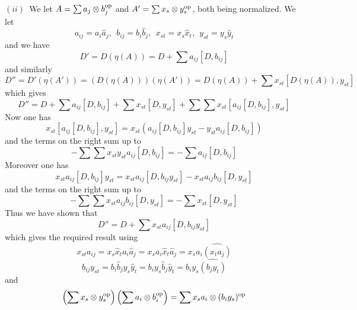 \documentclass[preprint]{revtex4}
\begin{document}
$(ii)$~We let $A=\sum a_j\otimes b_j^{\rm op}$ and $A'=\sum x_s\otimes y_s^{\rm op}$,   both being normalized. We let
\begin{equation*}
    a_{ij}=a_i\hat a_j,\ \ b_{ij}=b_i\hat b_j,\ \
    x_{st}=x_s\hat x_t,\ \ y_{st}=y_s\hat y_t
\end{equation*}
and we have
\begin{equation*}
    D'=D(\eta(A))=D+\sum a_{ij}[D,b_{ij}]
\end{equation*}
and similarly
\begin{equation*}
   D''=D'(\eta(A'))=\left(D(\eta(A))\right)(\eta(A'))=D(\eta(A))+
   \sum x_{st}[D(\eta(A)),y_{st}]
\end{equation*}
which gives
\begin{equation*}
    D''=D+\sum a_{ij}[D,b_{ij}]+\sum x_{st}[D,y_{st}]+
    \sum\sum x_{st}[a_{ij}[D,b_{ij}],y_{st}]
\end{equation*}
Now one has
\begin{equation*}
   x_{st}[a_{ij}[D,b_{ij}],y_{st}]=x_{st}\left(a_{ij}[D,b_{ij}]y_{st}-
   y_{st}a_{ij}[D,b_{ij}]
   \right)
\end{equation*}
and the terms on the right sum up to
\begin{equation*}
  -\sum\sum    x_{st}y_{st}a_{ij}[D,b_{ij}]=-\sum a_{ij}[D,b_{ij}]
\end{equation*}
Moreover one has
\begin{equation*}
    x_{st}a_{ij}[D,b_{ij}]y_{st}=x_{st}a_{ij}[D,b_{ij}y_{st}]-x_{st}a_{ij}b_{ij}[D,y_{st}]
\end{equation*}
and the terms on the right sum up to
\begin{equation*}
    -\sum\sum x_{st}a_{ij}b_{ij}[D,y_{st}]=-\sum x_{st}[D,y_{st}]
\end{equation*}
Thus we have shown that
\begin{equation*}
    D''=D+\sum x_{st}a_{ij}[D,b_{ij}y_{st}]
\end{equation*}
which gives the required result using
\begin{equation*}
    x_{st}a_{ij}=x_s\hat x_ta_i\hat a_j=x_sa_i\hat x_t\hat a_j=x_sa_i\widehat{(x_ta_j)}
\end{equation*}
\begin{equation*}
   b_{ij}y_{st}=b_i\hat b_j y_s\hat y_t=b_iy_s\hat b_j \hat y_t=
   b_iy_s\widehat{(b_jy_t)}
\end{equation*}
and
\begin{equation*}
    \left(\sum x_s\otimes y_s^{\rm op}\right) \left(\sum a_i\otimes b_i^{\rm op}\right)=
    \sum x_sa_i\otimes (b_iy_s)^{\rm op}
\end{equation*}
\end{document}
